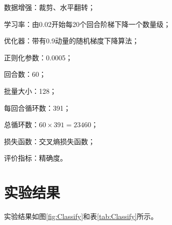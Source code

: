 \documentclass[12pt]{article}
\begin{document}
数据增强：裁剪、水平翻转；

学习率：由0.02开始每20个回合阶梯下降一个数量级；

优化器：带有0.9动量的随机梯度下降算法；

正则化参数：0.0005；

回合数：60；

批量大小：128；

每回合循环数：391；

总循环数：$ 60 \times 391 = 23460 $；

损失函数：交叉熵损失函数；

评价指标：精确度。

\section{实验结果}

实验结果如图\ref{fig:Classify}和表\ref{tab:Classify}所示。
\end{document}
